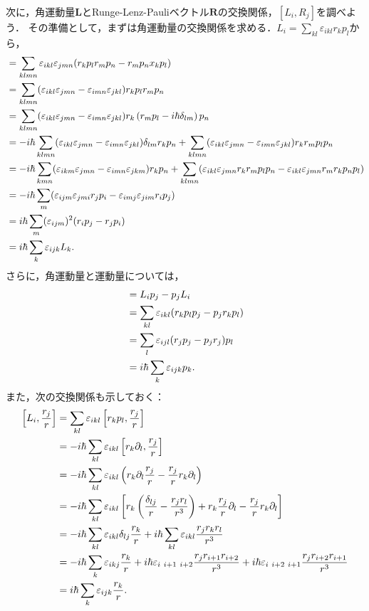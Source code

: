 次に，角運動量$\boldsymbol{L}$とRunge-Lenz-Pauliベクトル$\boldsymbol{R}$の交換関係，$[L_i,R_j]$を調べよう．
その準備として，まずは角運動量の交換関係を求める．$L_i=\sum_{kl}\varepsilon_{ikl}r_kp_l$から，
\begin{align}
  [L_i,L_j] & = \sum_{klmn}\varepsilon_{ikl}\varepsilon_{jmn}(r_kp_lr_mp_n - r_mp_nx_kp_l)\notag\\
  & = \sum_{klmn}(\varepsilon_{ikl}\varepsilon_{jmn} - \varepsilon_{imn}\varepsilon_{jkl})r_kp_lr_mp_n\notag\\
  & = \sum_{klmn}(\varepsilon_{ikl}\varepsilon_{jmn} - \varepsilon_{imn}\varepsilon_{jkl})r_k\left(r_mp_l - i\hbar\delta_{lm}\right)p_n\notag\\
  & = - i\hbar\sum_{klmn}(\varepsilon_{ikl}\varepsilon_{jmn} - \varepsilon_{imn}\varepsilon_{jkl})\delta_{lm}r_kp_n + \sum_{klmn}(\varepsilon_{ikl}\varepsilon_{jmn} - \varepsilon_{imn}\varepsilon_{jkl})r_kr_mp_lp_n\notag\\
  & = - i\hbar\sum_{kmn}(\varepsilon_{ikm}\varepsilon_{jmn} - \varepsilon_{imn}\varepsilon_{jkm})r_kp_n + \sum_{klmn}(\varepsilon_{ikl}\varepsilon_{jmn}r_kr_mp_lp_n - \varepsilon_{ikl}\varepsilon_{jmn}r_mr_kp_np_l)\notag\\
  & = - i\hbar\sum_{m}(\varepsilon_{ijm}\varepsilon_{jmi}r_jp_i - \varepsilon_{imj}\varepsilon_{jim}r_ip_j)\notag\\
  & = i\hbar\sum_m(\varepsilon_{ijm})^2(r_ip_j - r_jp_i)\notag\\
  & = i\hbar\sum_k\varepsilon_{ijk}L_k\label{LL}.
\end{align}
さらに，角運動量と運動量については，
\begin{align}
  [L_i,p_j] & = L_ip_j - p_jL_i\notag\\
  & = \sum_{kl}\varepsilon_{ikl}(r_kp_lp_j - p_jr_kp_l)\notag\\
  & = \sum_l\varepsilon_{ijl}(r_jp_j - p_jr_j)p_l\notag\\
  & = i\hbar\sum_k\varepsilon_{ijk}p_k\label{Lp}.
\end{align}
また，次の交換関係も示しておく：
\begin{align}
  \left[L_i,\frac{r_j}{r}\right]
  & = \sum_{kl}\varepsilon_{ikl}\left[r_kp_l,\frac{r_j}{r}\right]\notag\\
  & = - i\hbar\sum_{kl}\varepsilon_{ikl}\left[r_k\partial_l,\frac{r_j}{r}\right]\notag\\
  & = - i\hbar\sum_{kl}\varepsilon_{ikl}\left(r_k\partial_l\frac{r_j}{r} - \frac{r_j}{r}r_k\partial_l\right)\notag\\
  & = - i\hbar\sum_{kl}\varepsilon_{ikl}\left[r_k\left(\frac{\delta_{lj}}{r} - \frac{r_jr_l}{r^3}\right) + r_k\frac{r_j}{r}\partial_l - \frac{r_j}{r}r_k\partial_l\right]\notag\\
  & = - i\hbar\sum_{kl}\varepsilon_{ikl}\delta_{lj}\frac{r_k}{r} + i\hbar\sum_{kl}\varepsilon_{ikl}\frac{r_jr_kr_l}{r^3}\notag\\
  & = - i\hbar\sum_{k}\varepsilon_{ikj}\frac{r_k}{r} + i\hbar\varepsilon_{i\ i + 1\ i + 2}\frac{r_jr_{i + 1}r_{i + 2}}{r^3} + i\hbar\varepsilon_{i\ i + 2\ i + 1}\frac{r_jr_{i + 2}r_{i + 1}}{r^3}\notag\\
  & = i\hbar\sum_k\varepsilon_{ijk}\frac{r_k}{r}\label{Lr/r}.
\end{align}
